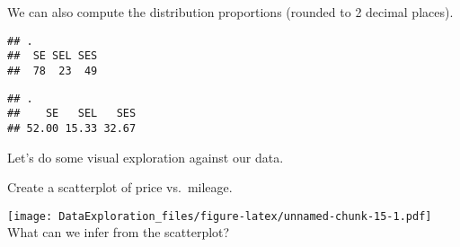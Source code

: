 \documentclass[]{article}
\newenvironment{Shaded}{\begin{snugshade}}{\end{snugshade}}
\newcommand{\DataTypeTok}[1]{\textcolor[rgb]{0.13,0.29,0.53}{#1}}
\newcommand{\DecValTok}[1]{\textcolor[rgb]{0.00,0.00,0.81}{#1}}
\newcommand{\KeywordTok}[1]{\textcolor[rgb]{0.13,0.29,0.53}{\textbf{#1}}}
\newcommand{\NormalTok}[1]{#1}
\newcommand{\OperatorTok}[1]{\textcolor[rgb]{0.81,0.36,0.00}{\textbf{#1}}}
\newcommand{\StringTok}[1]{\textcolor[rgb]{0.31,0.60,0.02}{#1}}
\begin{document}
We can also compute the distribution proportions (rounded to 2 decimal
places).

\begin{Shaded}
\end{Shaded}

\begin{verbatim}
## .
##  SE SEL SES 
##  78  23  49
\end{verbatim}

\begin{Shaded}
\end{Shaded}

\begin{verbatim}
## .
##    SE   SEL   SES 
## 52.00 15.33 32.67
\end{verbatim}

Let's do some visual exploration against our data.

Create a scatterplot of price vs.~mileage.

\begin{Shaded}
\end{Shaded}

\texttt{[image: DataExploration\_files/figure-latex/unnamed-chunk-15-1.pdf]}
What can we infer from the scatterplot?
\end{document}
